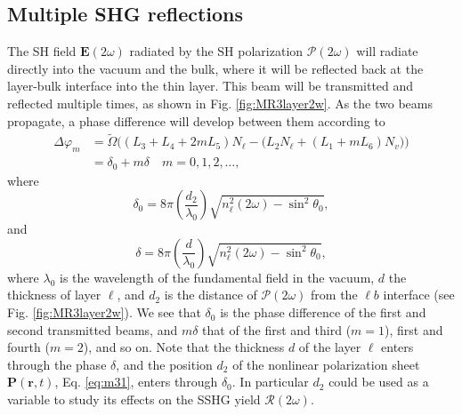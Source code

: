 
\subsection{Multiple SHG reflections}

The SH field $\mathbf{E}(2\omega)$ radiated by the SH polarization
$\boldsymbol{\mathcal{P}}(2\omega)$ will radiate directly into the vacuum and
the bulk, where it will be reflected back at the layer-bulk interface into the
thin layer. This beam will be transmitted and reflected multiple times, as shown
in Fig. \ref{fig:MR3layer2w}. As the two beams propagate, a phase difference
will develop between them according to
\begin{equation}\label{eq:m99}
\begin{split}
\Delta\varphi_{m} 
&= \tilde{\Omega}
\Big(
(L_{3} + L_{4} + 2mL_{5})N_{\ell}
 - \big(L_{2}N_{\ell} + (L_{1} + mL_{6})N_{v}\big)
\Big)\\
&= \delta_{0} + m\delta\quad m=0,1,2,\ldots,
\end{split}
\end{equation}
where
\begin{equation}\label{delta0}
\delta_{0} =
8\pi\left(\frac{d_{2}}{\lambda_{0}}\right)
\sqrt{n^{2}_{\ell}(2\omega)-\sin^{2}\theta_{0}},
\end{equation}
and
\begin{equation}\label{delta}
\delta = 8\pi
\left(\frac{d}{\lambda_{0}}\right)
\sqrt{n^{2}_{\ell}(2\omega)-\sin^{2}\theta_{0}},
\end{equation}
where $\lambda_{0}$ is the wavelength of the fundamental field in the vacuum,
$d$ the thickness of layer $\ell$, and $d_{2}$ is the distance of
$\boldsymbol{\mathcal{P}}(2\omega)$ from the $\ell b$ interface (see Fig.
\ref{fig:MR3layer2w}). We see that $\delta_{0}$ is the phase difference of the
first and second transmitted beams, and $m\delta$ that of the first and third
($m = 1$), first and fourth ($m = 2$), and so on. Note that the thickness $d$ of
the layer $\ell$ enters through the phase $\delta$, and the position $d_{2}$ of
the nonlinear polarization sheet $\mathbf{P}(\mathbf{r},t)$, Eq. \eqref{eq:m31},
enters through $\delta_{0}$. In particular $d_{2}$ could be used as a variable
to study its effects on the SSHG yield $\mathcal{R}(2\omega)$.

